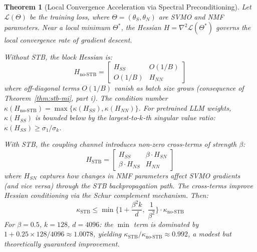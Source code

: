 \documentclass[conference]{IEEEtran}
\newtheorem{theorem}{Theorem}[section]
\begin{document}
\begin{theorem}[Local Convergence Acceleration via Spectral Preconditioning]
\label{thm:stb-conv}
Let $\mathcal{L}(\Theta)$ be the training loss, where $\Theta = (\theta_S, \theta_N)$ are SVMO and NMF parameters. Near a local minimum $\Theta^*$, the Hessian $H = \nabla^2 \mathcal{L}(\Theta^*)$ governs the local convergence rate of gradient descent.

Without STB, the block Hessian is:
\begin{equation}
H_{\text{no-STB}} = \begin{bmatrix} H_{SS} & O(1/B) \\ O(1/B) & H_{NN} \end{bmatrix}
\end{equation}
where off-diagonal terms $O(1/B)$ vanish as batch size grows (consequence of Theorem~\ref{thm:stb-mi}, part i). The condition number $\kappa(H_{\text{no-STB}}) = \max\{\kappa(H_{SS}), \kappa(H_{NN})\}$. For pretrained LLM weights, $\kappa(H_{SS})$ is bounded below by the largest-to-$k$-th singular value ratio: $\kappa(H_{SS}) \geq \sigma_1/\sigma_k$.

With STB, the coupling channel introduces non-zero cross-terms of strength $\beta$:
\begin{equation}
H_{\text{STB}} = \begin{bmatrix} H_{SS} & \beta \cdot H_{SN} \\ \beta \cdot H_{NS} & H_{NN} \end{bmatrix}
\end{equation}
where $H_{SN}$ captures how changes in NMF parameters affect SVMO gradients (and vice versa) through the STB backpropagation path. The cross-terms improve Hessian conditioning via the Schur complement mechanism. Then:
\begin{equation}
\kappa_{\text{STB}} \leq \min\!\Big\{1 + \frac{\beta^2 k}{d},\; \frac{1}{\beta^2}\Big\} \cdot \kappa_{\text{no-STB}}
\end{equation}
For $\beta=0.5$, $k=128$, $d=4096$: the $\min$ term is dominated by $1 + 0.25 \times 128 / 4096 \approx 1.0078$, yielding $\kappa_{\text{STB}}/\kappa_{\text{no-STB}} \approx 0.992$, a modest but theoretically guaranteed improvement.
\end{theorem}
\end{document}
